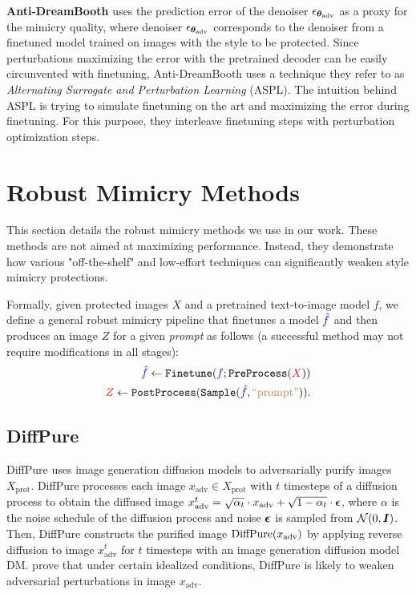 \documentclass{article}
\newcommand{\adv}[1]{#1_{\textrm{adv}}}
\newcommand{\model}[1]{\mathrm{#1}}
\newcommand{\advdenoiser}[0]{\eps_{\adv{\vtheta}}}
\newcommand{\advimg}[0]{x_{\textrm{adv}}}
\newcommand{\advimgset}[0]{X_{\textrm{prot}}}
\begin{document}
\textbf{Anti-DreamBooth}\label{sec:antidb} \citep{antidreambooth} uses the prediction error of the denoiser $\advdenoiser$ as a proxy for the mimicry quality, where denoiser $\advdenoiser$ corresponds to the denoiser from a finetuned model trained on images with the style to be protected. Since perturbations maximizing the error with the pretrained decoder can be easily circunvented with finetuning, Anti-DreamBooth uses a technique they refer to as \textit{Alternating Surrogate and Perturbation Learning} (ASPL). The intuition behind ASPL is trying to simulate finetuning on the art and maximizing the error during finetuning. For this purpose, they interleave finetuning steps with perturbation optimization steps.

\section{Robust Mimicry Methods}
\label{sec:defenseappendix}

This section details the robust mimicry methods we use in our work. These methods are not aimed at maximizing performance. Instead, they demonstrate how various "off-the-shelf" and low-effort techniques can significantly weaken style mimicry protections. 

Formally, given protected images {\color{red}$X$} and a pretrained text-to-image model {\color{blue}$f$}, we define a general robust mimicry pipeline that finetunes a model ${\color{blue}\hat{f}}$ and then produces an image {\color{red}$Z$} for a given {\color{brown}\emph{prompt}} as follows (a successful method may not require modifications in all stages):
\begin{align*}
{\color{blue}\hat{f}} \gets \texttt{Finetune}({\color{blue}f}; \texttt{PreProcess}({\color{red}X})) \\
{\color{red}Z} \gets \texttt{PostProcess}(\texttt{Sample}({\color{blue}\hat{f}}, {\color{brown}\mathrm{``prompt"}})).
\end{align*}


\subsection{DiffPure}
\label{sec:diffpure}
DiffPure \citep{diffpure} uses image generation diffusion models to adversarially purify images $\advimgset$. DiffPure processes
each image $\advimg \in \advimgset$ with $t$ timesteps of a diffusion
process to obtain the diffused image $\advimg^{t} = \sqrt{\alpha_t} \cdot \advimg + \sqrt{1 - \alpha_t} \cdot \veps$, where $\alpha$ is the noise schedule of the diffusion process and noise ${\bm{{\epsilon}}}$ is sampled from $\mathrm{\mathcal{N}}\!\left(0, {\bm{I}}\right)$. Then, DiffPure constructs the purified image $\f{\mathrm{DiffPure}}{\advimg}$ by applying reverse diffusion to image $\advimg^{t}$ for $t$ timesteps with an image generation diffusion model $\model{DM}$. \citeauthor{diffpure} prove that under certain idealized conditions, DiffPure is likely to weaken adversarial
perturbations in image $\advimg$.
\end{document}
